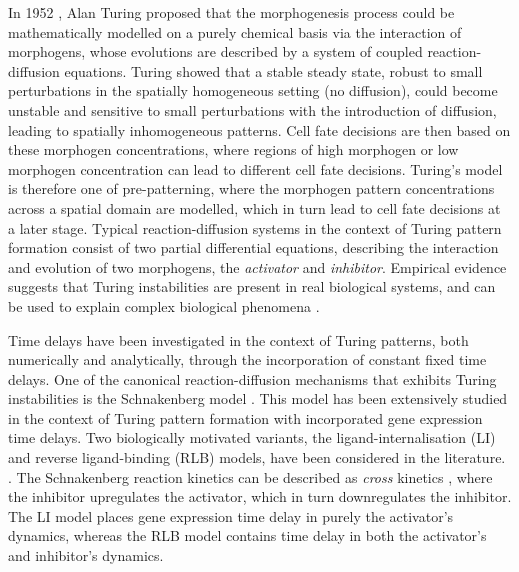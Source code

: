In 1952 \cite{turing}, Alan Turing proposed that the morphogenesis process could be mathematically modelled on a purely chemical basis via the interaction of morphogens, whose evolutions are described by a system of coupled reaction-diffusion equations. Turing showed that a stable steady state, robust to small perturbations in the spatially homogeneous setting (no diffusion), could become unstable and sensitive to small perturbations with the introduction of diffusion, leading to spatially inhomogeneous patterns. Cell fate decisions are then based on these morphogen concentrations, where regions of high morphogen or low morphogen concentration can lead to different cell fate decisions. Turing's model is therefore one of pre-patterning, where the morphogen pattern concentrations across a spatial domain are modelled, which in turn lead to cell fate decisions at a later stage. Typical reaction-diffusion systems in the context of Turing pattern formation consist of two partial differential equations, describing the interaction and evolution of two morphogens, the \textit{activator} and \textit{inhibitor}. Empirical evidence suggests that Turing instabilities are present in real biological systems, and can be used to explain complex biological phenomena \cite{yigaffneyli,molecular,miura,miura2,sick}. 

Time delays have been investigated in the context of Turing patterns, both numerically and analytically, through the incorporation of constant fixed time delays. One of the canonical reaction-diffusion mechanisms that exhibits Turing instabilities is the Schnakenberg model \cite{schnakenberg}. This model has been extensively studied in the context of Turing pattern formation with incorporated gene expression time delays. Two biologically motivated variants, the ligand-internalisation (LI) and reverse ligand-binding (RLB) models, have been considered in the literature. . The Schnakenberg reaction kinetics can be described as \textit{cross} kinetics \cite{leegaffney}, where the inhibitor upregulates the activator, which in turn downregulates the inhibitor. The LI model places gene expression time delay in purely the activator's dynamics, whereas the RLB model contains time delay in both the activator's and inhibitor's dynamics.

